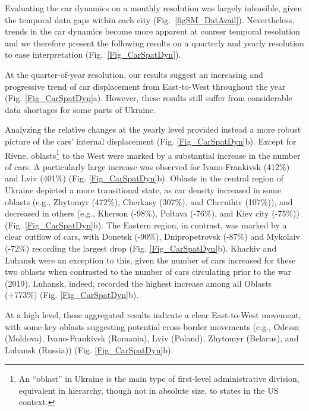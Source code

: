 \documentclass[sn-basic]{sn-jnl}%
\begin{document}
Evaluating the car dynamics on a monthly resolution was largely infeasible, given the temporal data gaps within each city (Fig.~\ref{figSM_DatAvail}). Nevertheless, trends in the car dynamics become more apparent at coarser temporal resolution and we therefore present the following results on a quarterly and yearly resolution to ease interpretation (Fig.~\ref{Fig_CarSpatDyn}).

At the quarter-of-year resolution, our results suggest an increasing and progressive trend of car displacement from East-to-West throughout the year (Fig. \ref{Fig_CarSpatDyn}a). However, these results still suffer from considerable data shortages for some parts of Ukraine. %

Analyzing the relative changes at the yearly level provided instead a more robust picture of the cars' internal displacement (Fig. \ref{Fig_CarSpatDyn}b). Except for Rivne, oblasts\footnote{An ``oblast'' in Ukraine is the main type of first-level administrative division, equivalent in hierarchy, though not in absolute size, to states in the US context.} to the West were marked by a substantial increase in the number of cars. A particularly large increase was observed for Ivano-Frankivsk (412\%) and Lviv (401\%) (Fig. \ref{Fig_CarSpatDyn}b). Oblasts in the central region of Ukraine depicted a more transitional state, as car density increased in some oblasts (e.g., Zhytomyr (472\%), Cherkasy (307\%), and Chernihiv (107\%)), and decreased in others (e.g., Kherson (-98\%), Poltava (-76\%), and Kiev city (-75\%))(Fig. \ref{Fig_CarSpatDyn}b). The Eastern region, in contrast, was marked by a clear outflow of cars, with Donetsk (-90\%), Dnipropetrovsk (-87\%) and Mykolaiv (-72\%) recording the largest drop (Fig. \ref{Fig_CarSpatDyn}b). Kharkiv and Luhansk were an exception to this, given the number of cars increased for these two oblasts when contrasted to the number of cars circulating prior to the war (2019). Luhansk, indeed, recorded the highest increase among all Oblasts (+773\%) (Fig. \ref{Fig_CarSpatDyn}b).

At a high level, these aggregated results indicate a clear East-to-West movement, with some key oblasts suggesting potential cross-border movements (e.g., Odessa (Moldova), Ivano-Frankivsk (Romania), Lviv (Poland), Zhytomyr (Belarus), and Luhansk (Russia)) (Fig. \ref{Fig_CarSpatDyn}b).
\end{document}
